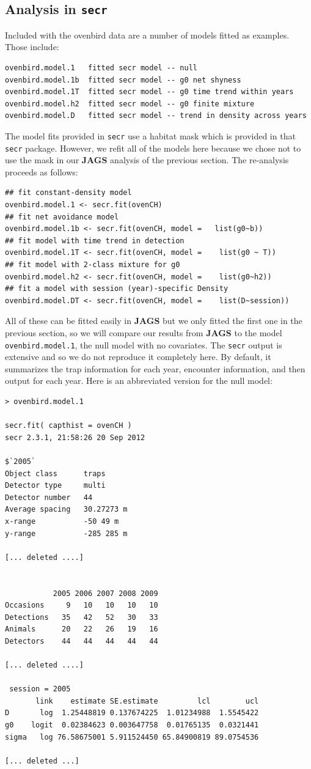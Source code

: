 \subsection{Analysis in \mbox{\tt secr} }


Included with the ovenbird data are a number of  models fitted as
examples. Those include:
{\small
\begin{verbatim}
ovenbird.model.1   fitted secr model -- null
ovenbird.model.1b  fitted secr model -- g0 net shyness
ovenbird.model.1T  fitted secr model -- g0 time trend within years
ovenbird.model.h2  fitted secr model -- g0 finite mixture
ovenbird.model.D   fitted secr model -- trend in density across years
\end{verbatim}
}
The model fits provided in \mbox{\tt secr} use a habitat mask which is
provided in that \mbox{\tt secr} package.
However, we
refit all of the models here because we chose not to use the mask in
our {\bf JAGS} analysis of the previous section.
The re-analysis proceeds as follows:
{\small
\begin{verbatim}
## fit constant-density model
ovenbird.model.1 <- secr.fit(ovenCH)
## fit net avoidance model
ovenbird.model.1b <- secr.fit(ovenCH, model =   list(g0~b))
## fit model with time trend in detection
ovenbird.model.1T <- secr.fit(ovenCH, model =    list(g0 ~ T))
## fit model with 2-class mixture for g0
ovenbird.model.h2 <- secr.fit(ovenCH, model =    list(g0~h2))
## fit a model with session (year)-specific Density
ovenbird.model.DT <- secr.fit(ovenCH, model =    list(D~session))
\end{verbatim}
}

All of these can be fitted easily in {\bf JAGS} but
we only fitted the first one in the previous section, so we will
compare our results from {\bf JAGS} to the
model {\tt ovenbird.model.1}, the null model with no covariates.
The \mbox{\tt secr} %
output is extensive %
and so we
do not reproduce it completely here. By default, it summarizes the
trap information for each year, encounter information, and then output for
each year. Here is an abbreviated version for the null model:
{\small
\begin{verbatim}
> ovenbird.model.1

secr.fit( capthist = ovenCH )
secr 2.3.1, 21:58:26 20 Sep 2012

$`2005`
Object class      traps
Detector type     multi
Detector number   44
Average spacing   30.27273 m
x-range           -50 49 m
y-range           -285 285 m

[... deleted ....]


           2005 2006 2007 2008 2009
Occasions     9   10   10   10   10
Detections   35   42   52   30   33
Animals      20   22   26   19   16
Detectors    44   44   44   44   44

[... deleted ....]

 session = 2005
       link    estimate SE.estimate         lcl        ucl
D       log  1.25448819 0.137674225  1.01234988  1.5545422
g0    logit  0.02384623 0.003647758  0.01765135  0.0321441
sigma   log 76.58675001 5.911524450 65.84900819 89.0754536

[... deleted ...]
\end{verbatim}
}

